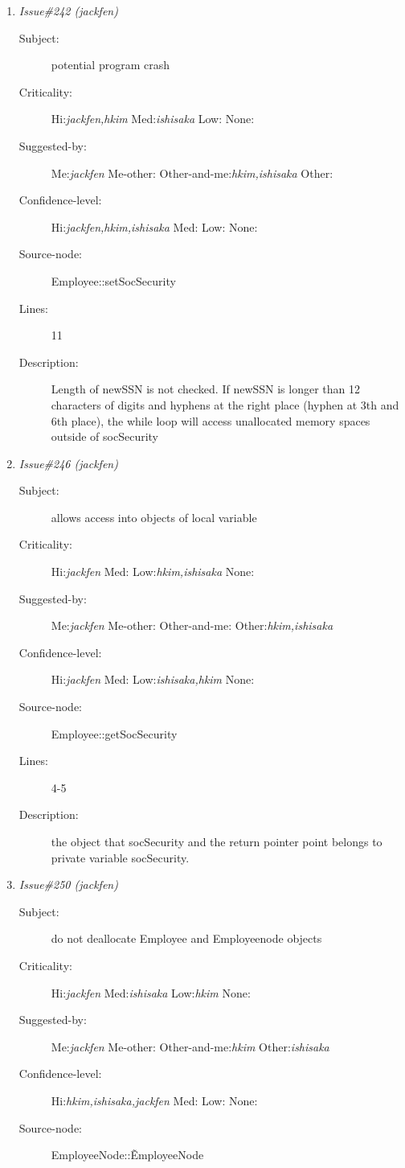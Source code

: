 \begin{enumerate}
\begin{description}
\item [Lines:] 17-19

\item [Description:] missing copying of hyphens to socSecurity if
socSecurity was null.
\end{description}
\item {\it Issue\#242 (jackfen)}
\begin{description}
\item [Subject:] potential program crash
\item [Criticality:] Hi:{\it jackfen,hkim} Med:{\it ishisaka} Low:{\it } None:{\it }
\item [Suggested-by:] Me:{\it jackfen} Me-other:{\it } Other-and-me:{\it hkim,ishisaka} Other:{\it }
\item [Confidence-level:] Hi:{\it jackfen,hkim,ishisaka} Med:{\it } Low:{\it } None:{\it }
\item [Source-node:] Employee::setSocSecurity

\item [Lines:] 11

\item [Description:] Length of newSSN is not checked.  If newSSN is
longer than 12 characters of digits and hyphens at the right place (hyphen at 3th and
6th place), the while loop will access unallocated memory spaces outside of socSecurity
\end{description}
\item {\it Issue\#246 (jackfen)}
\begin{description}
\item [Subject:] allows access into objects of local variable
\item [Criticality:] Hi:{\it jackfen} Med:{\it } Low:{\it hkim,ishisaka} None:{\it }
\item [Suggested-by:] Me:{\it jackfen} Me-other:{\it } Other-and-me:{\it } Other:{\it hkim,ishisaka}
\item [Confidence-level:] Hi:{\it jackfen} Med:{\it } Low:{\it ishisaka,hkim} None:{\it }
\item [Source-node:] Employee::getSocSecurity

\item [Lines:] 4-5

\item [Description:] the object that socSecurity and the return
pointer point belongs to private variable socSecurity.
\end{description}
\item {\it Issue\#250 (jackfen)}
\begin{description}
\item [Subject:] do not deallocate Employee and Employeenode objects
\item [Criticality:] Hi:{\it jackfen} Med:{\it ishisaka} Low:{\it hkim} None:{\it }
\item [Suggested-by:] Me:{\it jackfen} Me-other:{\it } Other-and-me:{\it hkim} Other:{\it ishisaka}
\item [Confidence-level:] Hi:{\it hkim,ishisaka,jackfen} Med:{\it } Low:{\it } None:{\it }
\item [Source-node:] EmployeeNode::\~EmployeeNode


\end{description}
\end{enumerate}
